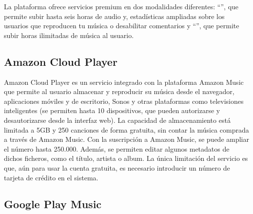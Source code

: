 La plataforma ofrece servicios premium en dos modalidades diferentes: ``'', que permite subir hasta seis horas de audio y, estadísticas ampliadas sobre los usuarios que reproducen tu música o desabilitar comentarios y ``'', que permite subir horas ilimitadas de música al usuario.

\subsection{Amazon Cloud Player \cite{ACP}} 
Amazon Cloud Player es un servicio integrado con la plataforma Amazon Music que permite al usuario almacenar y reproducir su música desde el navegador, aplicaciones móviles y de escritorio, Sonos y otras plataformas como televisiones inteligentes (se permiten hasta 10 dispositivos, que pueden autorizarse y desautorizarse desde la interfaz web). La capacidad de almacenamiento está limitada a 5GB y 250 canciones de forma gratuita, sin contar la música comprada a través de Amazon Music. Con la suscripción a Amazon Music, se puede ampliar el número hasta 250.000. Además, se permiten editar algunos metadatos de dichos ficheros, como el título, artista o album. La única limitación del servicio es que, aún para usar la cuenta gratuita, es necesario introducir un número de tarjeta de crédito en el sistema.

\subsection{Google Play Music \cite{GPM}} 
